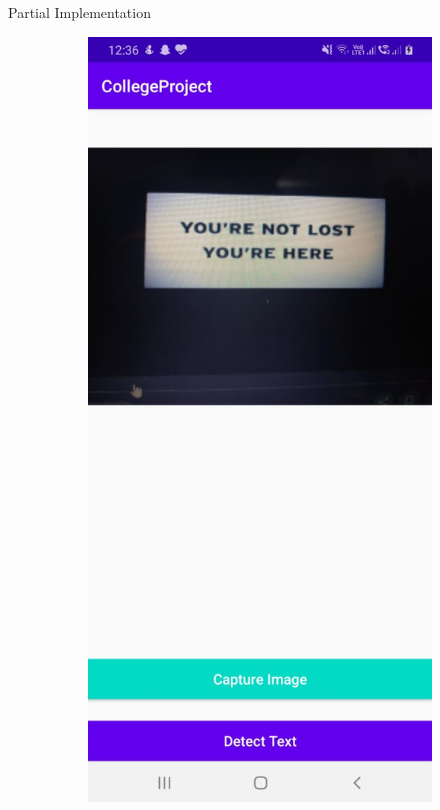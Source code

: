\documentclass{beamer}
\begin{document}
\begin{frame}[allowframebreaks]{Partial Implementation}
\begin{figure}
\begin{subfigure}[b]{0.2\linewidth}
			\label{App}
           \end{subfigure}
	\begin{subfigure}[b]{0.2\linewidth}
			{\includegraphics[width=\linewidth]{App_3}}

\end{subfigure}
\end{figure}
\end{frame}
\end{document}

